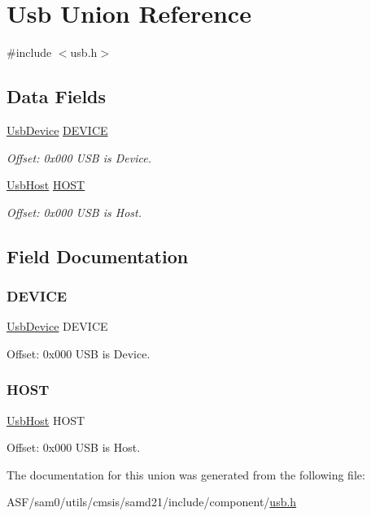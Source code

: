 \hypertarget{union_usb}{}\section{Usb Union Reference}
\label{union_usb}


{\ttfamily \#include $<$usb.\+h$>$}

\subsection*{Data Fields}
\begin{DoxyCompactItemize}
\item 
\mbox{\hyperlink{struct_usb_device}{Usb\+Device}} \mbox{\hyperlink{union_usb_a9591f41ad24057588d3edf9272b64edf}{D\+E\+V\+I\+CE}}
\begin{DoxyCompactList}\small\item\em Offset\+: 0x000 U\+SB is Device. \end{DoxyCompactList}\item 
\mbox{\hyperlink{struct_usb_host}{Usb\+Host}} \mbox{\hyperlink{union_usb_abb25f09fce6e6c542c503fcc533e19f1}{H\+O\+ST}}
\begin{DoxyCompactList}\small\item\em Offset\+: 0x000 U\+SB is Host. \end{DoxyCompactList}\end{DoxyCompactItemize}


\subsection{Field Documentation}
\mbox{\label{union_usb_a9591f41ad24057588d3edf9272b64edf}} 
\subsubsection{\texorpdfstring{DEVICE}{DEVICE}}
{\footnotesize\ttfamily \mbox{\hyperlink{struct_usb_device}{Usb\+Device}} D\+E\+V\+I\+CE}



Offset\+: 0x000 U\+SB is Device. 

\mbox{\label{union_usb_abb25f09fce6e6c542c503fcc533e19f1}} 
\subsubsection{\texorpdfstring{HOST}{HOST}}
{\footnotesize\ttfamily \mbox{\hyperlink{struct_usb_host}{Usb\+Host}} H\+O\+ST}



Offset\+: 0x000 U\+SB is Host. 



The documentation for this union was generated from the following file\+:\begin{DoxyCompactItemize}
\item 
A\+S\+F/sam0/utils/cmsis/samd21/include/component/\mbox{\hyperlink{component_2usb_8h}{usb.\+h}}\end{DoxyCompactItemize}
